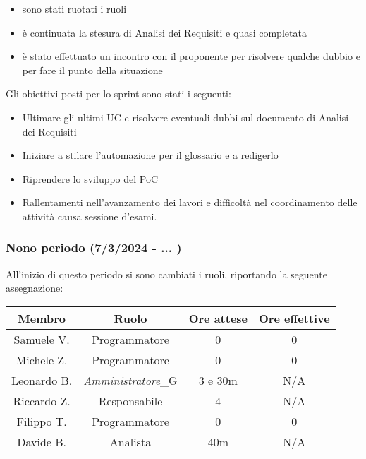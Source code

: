 \begin{itemize}
    \item sono stati ruotati i ruoli
    \item è continuata la stesura di Analisi dei Requisiti e quasi completata
    \item è stato effettuato un incontro con il proponente per risolvere qualche dubbio e per fare il punto della situazione
\end{itemize}

Gli obiettivi posti per lo sprint sono stati i seguenti:
\begin{itemize}
    \item Ultimare gli ultimi UC e risolvere eventuali dubbi sul documento di Analisi dei Requisiti
    \item Iniziare a stilare l'automazione per il glossario e a redigerlo
    \item Riprendere lo sviluppo del PoC
\end{itemize}

\begin{itemize}
    \item Rallentamenti nell'avanzamento dei lavori e difficoltà nel coordinamento delle attività causa sessione d'esami.
\end{itemize}


\subsubsection{Nono periodo (7/3/2024 - ... )}
All'inizio di questo periodo si sono cambiati i ruoli, riportando la seguente assegnazione:

\vspace{10 mm}
\begin{tabular}{|c|c|c|c|}
\hline
\textbf{Membro} & \textbf{Ruolo} & \textbf{Ore attese} & \textbf{Ore effettive} \\
\hline
Samuele V. & Programmatore & 0 & 0 \\
\hline
Michele Z. & Programmatore & 0 & 0 \\
\hline
Leonardo B. & \textit{Amministratore}_G & 3 e 30m & N/A \\
\hline
Riccardo Z. & Responsabile & 4 & N/A \\
\hline
Filippo T. & Programmatore & 0 & 0 \\
\hline
Davide B. & Analista & 40m & N/A \\
\hline
\end{tabular}
\vspace{10 mm}

